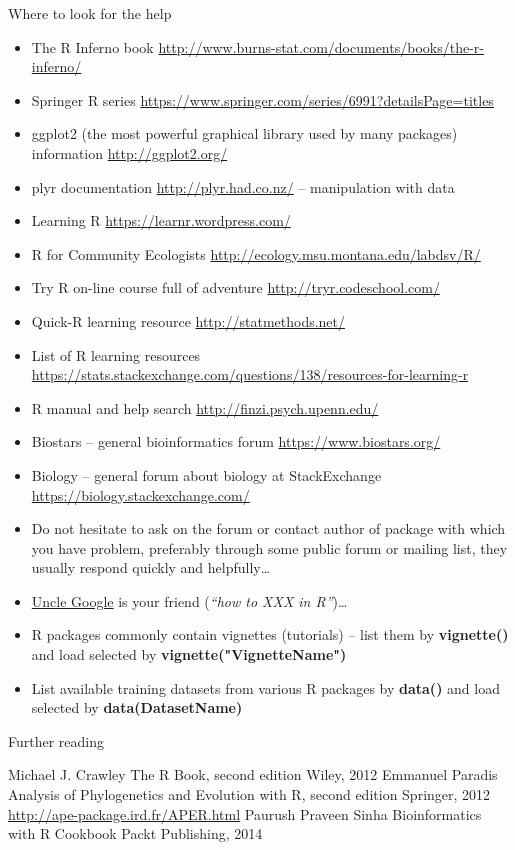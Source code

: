 \documentclass[compress, ucs, xelatex, 11pt, xcolor=svgnames,
  hyperref={
    bookmarks=true,
    unicode=true,
    colorlinks=true,
    pdftitle={Molecular data in R},
    plainpages=false,
    pdfauthor={Vojtech Zeisek},
    pdfsubject={Course about phylogeny and evolution in R},
    pdfcreator={XeLaTeX},
    pdfkeywords={R, evolution, phylogeny, molecular data},
    linkcolor=Tomato,
    anchorcolor=SaddleBrown,
    citecolor=Goldenrod,
    filecolor=DarkMagenta,
    menucolor=Sienna,
    urlcolor=DarkTurquoise,
    pdftex},
  url={hyphens, lowtilde} %
  ]{beamer}
\begin{document}
\begin{frame}[allowframebreaks]{Where to look for the help}
\begin{itemize}
 \item The R Inferno book \url{http://www.burns-stat.com/documents/books/the-r-inferno/}
 \item Springer R series \url{https://www.springer.com/series/6991?detailsPage=titles}
 \item ggplot2 (the most powerful graphical library used by many packages) information \url{http://ggplot2.org/}
 \item plyr documentation \url{http://plyr.had.co.nz/} -- manipulation with data
 \item Learning R \url{https://learnr.wordpress.com/}
 \item R for Community Ecologists \url{http://ecology.msu.montana.edu/labdsv/R/}
 \item Try R on-line course full of adventure \url{http://tryr.codeschool.com/}
 \item Quick-R learning resource \url{http://statmethods.net/}
 \item List of R learning resources \url{https://stats.stackexchange.com/questions/138/resources-for-learning-r}
 \item R manual and help search \url{http://finzi.psych.upenn.edu/}
 \item Biostars -- general bioinformatics forum \url{https://www.biostars.org/}
 \item Biology -- general forum about biology at StackExchange \url{https://biology.stackexchange.com/}
 \item Do not hesitate to ask on the forum or contact author of package with which you have problem, preferably through some public forum or mailing list, they usually respond quickly and helpfully\ldots
 \item \href{http://rseek.org/}{Uncle Google} is your friend (\textit{``how to XXX in R''})\ldots
 \item R packages commonly contain vignettes (tutorials) -- list them by \textbf{vignette()} and load selected by \textbf{vignette("VignetteName")}
 \item List available training datasets from various R packages by \textbf{data()} and load selected by \textbf{data(DatasetName)}
\end{itemize}
\end{frame}

\begin{frame}{Further reading}
\begin{thebibliography}{1}
    Michael J. Crawley
    \newblock The R Book, second edition
    \newblock Wiley, 2012
    Emmanuel Paradis
    \newblock Analysis of Phylogenetics and Evolution with R, second edition
    \newblock Springer, 2012
    \newblock \url{http://ape-package.ird.fr/APER.html}
    Paurush Praveen Sinha
    \newblock Bioinformatics with R Cookbook
    \newblock Packt Publishing, 2014
\end{thebibliography}
\end{frame}
\end{document}

